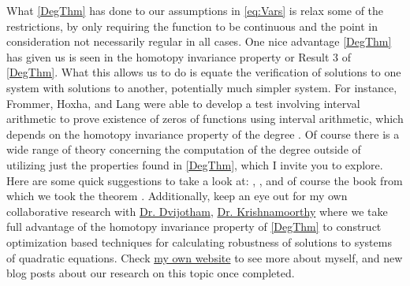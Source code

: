 \documentclass[11pt]{article}
\theoremstyle{plain}
\theoremstyle{definition}
\theoremstyle{remark}
\begin{document}
What \cref{DegThm} has done to our assumptions in \eqref{eq:Vars} is relax some of the restrictions, by only requiring the function to be continuous and the point in consideration not necessarily regular in all cases.
One nice advantage \cref{DegThm} has given us is seen in the homotopy invariance property or Result 3 of \cref{DegThm}.
What this allows us to do is equate the verification of solutions to one system with solutions to another, potentially much simpler system.
For instance, Frommer, Hoxha, and Lang were able to develop a test involving interval arithmetic to prove existence of zeros of functions using interval arithmetic, which depends on the homotopy invariance property of the degree \cite{FrHoLa2007}.
Of course there is a wide range of theory concerning the computation of the degree outside of utilizing just the properties found in \cref{DegThm}, which I invite you to explore. 
Here are some quick suggestions to take a look at: \cite{MoVrYa2002}, \cite{OnTh2006}, and of course the book from which we took the theorem \cite{OrChCh2006}. Additionally, keep an eye out for my own collaborative research with \href{https://dvij.github.io/}{Dr. Dvijotham}, \href{http://www.math.wsu.edu/math/faculty/bkrishna/}{Dr. Krishnamoorthy} where we take full advantage of the homotopy invariance property of  \cref{DegThm} to construct optimization based techniques for calculating robustness of solutions to systems of quadratic equations. Check \href{http://www.benrapone.com/}{my own website} to see more about myself, and new blog posts about our research on this topic once completed.

  

\end{document}
